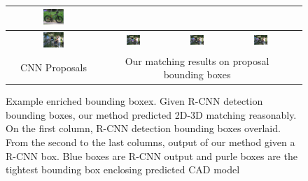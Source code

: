 \documentclass[10pt,twocolumn,letterpaper]{article}
\begin{document}
\begin{figure}[h]
\begin{tabular}{|c|c|c|c|c|}
  \includegraphics[width=0.24\textwidth]{bicycle_cnn/7b.png} &   
  &\\
  \hline
  \includegraphics[width=0.24\textwidth]{bicycle_cnn/4a.png} &   
  \includegraphics[width=0.24\textwidth]{bicycle_cnn/4b.png} &   
  \includegraphics[width=0.24\textwidth]{bicycle_cnn/4c.png} &   
  \includegraphics[width=0.24\textwidth]{bicycle_cnn/4d.png}  \\
  \hline
  CNN Proposals & \multicolumn{3}{|c|}{Our matching results on proposal bounding boxes} \\
  \hline
\end{tabular}
\caption{Example enriched bounding boxex. Given R-CNN\cite{Girshick14} detection bounding boxes, our method predicted 2D-3D matching reasonably. On the first column, R-CNN detection bounding boxes overlaid. From the second to the last columns, output of our method given a R-CNN box. Blue boxes are R-CNN output and purle boxes are the tightest bounding box enclosing predicted CAD model}
  \label{fig:pascal12cnn}
\end{figure}
\end{document}
